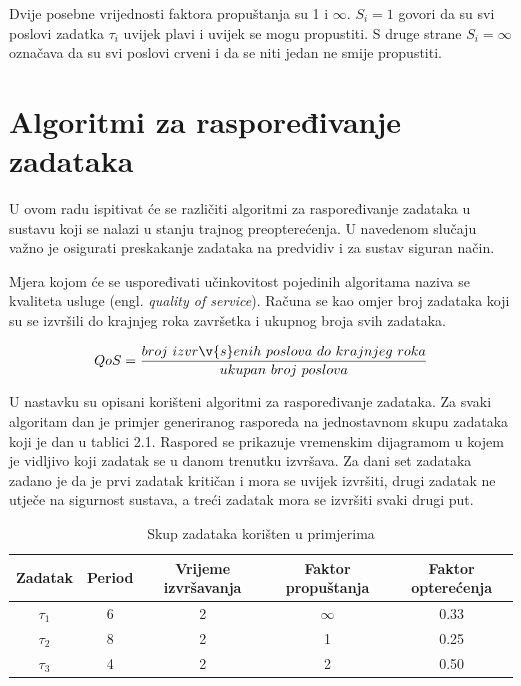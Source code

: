 \documentclass[../zavrsni.tex]{subfiles}
\begin{document}
Dvije posebne vrijednosti faktora propuštanja su 1 i $\infty$. $S_i=1$ govori da su svi poslovi zadatka $\tau_i$ uvijek plavi i uvijek se 
mogu propustiti. S druge strane $S_i=\infty$ označava da su svi poslovi crveni i da se niti jedan ne smije propustiti.

\section{Algoritmi za raspoređivanje zadataka}

U ovom radu ispitivat će se različiti algoritmi za raspoređivanje zadataka u sustavu koji se nalazi u stanju trajnog preopterećenja.
U navedenom slučaju važno je osigurati preskakanje zadataka na predvidiv i za sustav siguran način.

Mjera kojom će se uspoređivati učinkovitost pojedinih algoritama naziva se kvaliteta usluge (engl. \textit{quality of service}).
Računa se kao omjer broj zadataka koji su se izvršili do krajnjeg roka završetka i ukupnog broja svih zadataka.

\begin{equation*}
    QoS = \frac{broj\ izvr\v{s}enih\ poslova\ do\ krajnjeg\ roka}{ukupan\ broj\ poslova}
\end{equation*}

U nastavku su opisani korišteni algoritmi za raspoređivanje zadataka.
Za svaki algoritam dan je primjer generiranog rasporeda na jednostavnom skupu zadataka koji je dan u tablici 2.1. 
Raspored se prikazuje vremenskim dijagramom u kojem
je vidljivo koji zadatak se u danom trenutku izvršava. 
Za dani set zadataka zadano je da je prvi
zadatak kritičan i mora se uvijek izvršiti, drugi zadatak ne utječe na sigurnost sustava, a treći zadatak mora se izvršiti svaki drugi put.

\begin{table}[h!]
    \begin{center}
      \begin{tabular}{||c || c | c | c | c||} 
       \hline
       Zadatak & Period & Vrijeme izvršavanja & Faktor propuštanja & Faktor opterećenja \\ [0.5ex] 
       \hline\hline
       $\tau_1$ & 6 & 2 & $\infty$ & 0.33 \\ 
       \hline
       $\tau_2$ & 8 & 2 & 1 & 0.25 \\
       \hline
       $\tau_3$ & 4 & 2 & 2 & 0.50 \\
       \hline
      \end{tabular}
    \end{center}
    \caption{\label{tab:table-name}Skup zadataka korišten u primjerima}
    \end{table}
\end{document}
